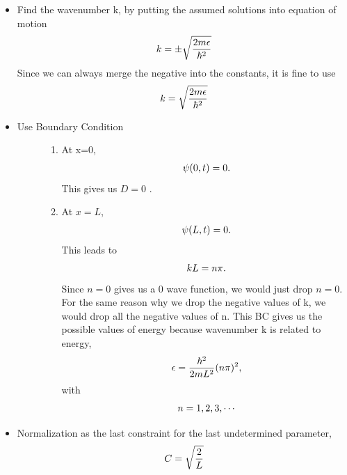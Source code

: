 \documentclass[letterpaper,10pt,english]{sphinxmanual}
\begin{document}
\begin{itemize}
\item {} 
Find the wavenumber k, by putting the assumed solutions into equation of motion
\begin{gather}
\begin{split}k = \pm \sqrt{\frac{2m \epsilon}{\hbar^2} }\end{split}\notag
\end{gather}
Since we can always merge the negative into the constants, it is fine to use
\begin{gather}
\begin{split}k = \sqrt{\frac{2m \epsilon}{\hbar^2} }\end{split}\notag
\end{gather}
\item {} \begin{description}
\item[{Use Boundary Condition}] \leavevmode\begin{enumerate}
\item {} 
At x=0,
\begin{gather}
\begin{split}\psi(0,t)=0 .\end{split}\notag
\end{gather}
This gives us \(D = 0\) .

\item {} 
At \(x=L\),
\begin{gather}
\begin{split}\psi(L,t)=0 .\end{split}\notag
\end{gather}
This leads to
\begin{gather}
\begin{split}k L = n \pi .\end{split}\notag
\end{gather}
Since \(n=0\) gives us a 0 wave function, we would just drop \(n=0\). For the same reason why we drop the negative values of k, we would drop all the negative values of n.
This BC gives us the possible values of energy because wavenumber k is related to energy,
\begin{gather}
\begin{split}\epsilon = \frac{\hbar^2}{2m L^2 } (n\pi)^2 ,\end{split}\notag
\end{gather}
with
\begin{gather}
\begin{split}n=1,2,3, \cdots\end{split}\notag
\end{gather}
\end{enumerate}

\end{description}

\item {} 
Normalization as the last constraint for the last undetermined parameter,
\begin{gather}
\begin{split}C=\sqrt{\frac{2}{L}}\end{split}\notag
\end{gather}
\end{itemize}
\end{document}

